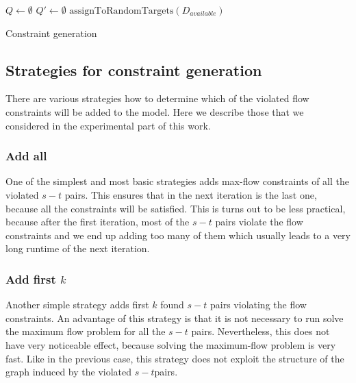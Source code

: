 \begin{algorithm}
 $Q\leftarrow\emptyset$
 $Q'\leftarrow\emptyset$
 $\text{assignToRandomTargets}(D_{available})$\;
 ~\newline
 \caption{Constraint generation}
\label{alg:cg}
\end{algorithm}

\subsection{Strategies for constraint generation}

There are various strategies how to determine which of the violated flow constraints will be added to the model. Here we describe those that we considered in the experimental part of this work.

\subsubsection{Add all}
One of the simplest and most basic strategies adds max-flow constraints of all the violated $s-t$ pairs. This ensures that in the next iteration is the last one, because all the constraints will be satisfied. This is turns out to be less practical, because after the first iteration, most of the $s-t$ pairs violate the flow constraints and we end up adding too many of them which usually leads to a very long runtime of the next iteration.

\subsubsection{Add first $k$}

Another simple strategy adds first $k$ found $s-t$ pairs violating the flow constraints. An advantage of this strategy is that it is not necessary to run solve the maximum flow problem for all the $s-t$ pairs. Nevertheless, this does not have very noticeable effect, because solving the maximum-flow problem is very fast. Like in the previous case, this strategy does not exploit the structure of the graph induced by the violated $s-t$pairs.

